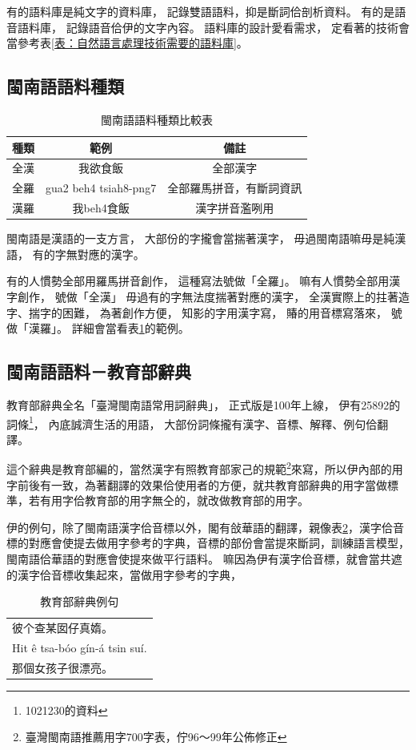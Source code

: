 有的語料庫是純文字的資料庫，
記錄雙語語料，抑是斷詞佮剖析資料。
有的是語音語料庫，
記錄語音佮伊的文字內容。
語料庫的設計愛看需求，
定看著的技術會當參考表\ref{表：自然語言處理技術需要的語料庫}。

\subsection{閩南語語料種類}
\label{節：閩南語語料種類}

\begin{table}
\caption{閩南語語料種類比較表}
\label{表：閩南語語料種類比較表}
\centering
\begin{tabular}{l|c|c}
種類 & 範例 & 備註\\
\hline
全漢 & 我欲食飯 & 全部漢字\\
全羅 & gua2 beh4 tsiah8-png7 & 全部羅馬拼音，有斷詞資訊\\
漢羅 &我beh4食飯 & 漢字拼音濫咧用\\
\end{tabular}
\end{table}

閩南語是漢語的一支方言，
大部份的字攏會當揣著漢字，
毋過閩南語嘛毋是純漢語，
有的字無對應的漢字。

有的人慣勢全部用羅馬拼音創作，
這種寫法號做「全羅」。
嘛有人慣勢全部用漢字創作，
號做「全漢」
毋過有的字無法度揣著對應的漢字，
全漢實際上的拄著造字、揣字的困難，
為著創作方便，
知影的字用漢字寫，
賰的用音標寫落來，
號做「漢羅」。
詳細會當看表\ref{表：閩南語語料種類比較表}的範例。

\subsection{閩南語語料－教育部辭典}
\label{節：教育部辭典}
教育部辭典全名「臺灣閩南語常用詞辭典」\cite{教育部臺灣閩南語常用詞辭典}，
正式版是100年上線，
伊有25892的詞條\footnote{1021230的資料}，
內底誠濟生活的用語，
大部份詞條攏有漢字、音標、解釋、例句佮翻譯。

這个辭典是教育部編的，當然漢字有照教育部家己的規範\footnote{臺灣閩南語推薦用字700字表，佇96～99年公佈修正}來寫，所以伊內部的用字前後有一致，為著翻譯的效果佮使用者的方便，就共教育部辭典的用字當做標準，若有用字佮教育部的用字無仝的，就改做教育部的用字。%

伊的例句，除了閩南語漢字佮音標以外，閣有敆華語的翻譯，親像表\ref{表：教育部辭典例句}，漢字佮音標的對應會使提去做用字參考的字典，音標的部份會當提來斷詞，訓練語言模型，閩南語佮華語的對應會使提來做平行語料。
嘛因為伊有漢字佮音標，就會當共遮的漢字佮音標收集起來，當做用字參考的字典，
\begin{table}
\caption{教育部辭典例句}
\label{表：教育部辭典例句}
\centering
\begin{tabular}{l}
彼个查某囡仔真媠。 \\
Hit ê tsa-bóo gín-á tsin suí.\\
那個女孩子很漂亮。\\
\end{tabular}
\end{table}

